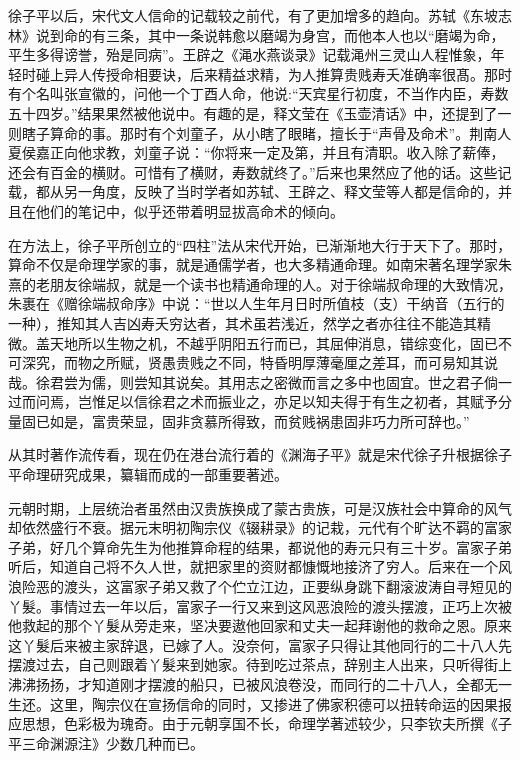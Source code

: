 \documentclass[a5paper,oneside,12pt]{ctexbook}
\begin{document}
徐子平以后，宋代文人信命的记载较之前代，有了更加增多的趋向。苏轼《东坡志林》说到命的有三条，其中一条说韩愈以磨竭为身宫，而他本人也以“磨竭为命，平生多得谤誉，殆是同病”。王辟之《渑水燕谈录》记载渑州三灵山人程惟象，年轻时碰上异人传授命相要诀，后来精益求精，为人推算贵贱寿夭准确率很髙。那时有个名叫张宣徽的，问他一个丁酉人命，他说:“天宾星行初度，不当作内臣，寿数五十四岁。”结果果然被他说中。有趣的是，释文莹在《玉壶清话》中，还提到了一则瞎子算命的事。那时有个刘童子，从小瞎了眼睹，擅长于“声骨及命术”。荆南人夏侯嘉正向他求教，刘童子说：“你将来一定及第，并且有清职。收入除了薪俸，还会有百金的横财。可惜有了横财，寿数就终了。”后来也果然应了他的话。这些记载，都从另一角度，反映了当时学者如苏轼、王辟之、释文莹等人都是信命的，并且在他们的笔记中，似乎还带着明显拔高命术的倾向。

在方法上，徐子平所创立的“四柱”法从宋代开始，已渐渐地大行于天下了。那时，算命不仅是命理学家的事，就是通儒学者，也大多精通命理。如南宋著名理学家朱熹的老朋友徐端叔，就是一个读书也精通命理的人。对于徐端叔命理的大致情况，朱裹在《赠徐端叔命序》中说：“世以人生年月日时所值枝（支）干纳音（五行的一种），推知其人吉凶寿夭穷达者，其术虽若浅近，然学之者亦往往不能造其精微。盖天地所以生物之机，不越乎阴阳五行而已，其屈伸消息，错综变化，固已不可深究，而物之所赋，贤愚贵贱之不同，特昏明厚薄毫厘之差耳，而可易知其说哉。徐君尝为儒，则尝知其说矣。其用志之密微而言之多中也固宜。世之君子倘一过而问焉，岂惟足以信徐君之术而振业之，亦足以知夫得于有生之初者，其赋予分量固已如是，富贵荣显，固非贪慕所得致，而贫贱祸患固非巧力所可辞也。”

从其时著作流传看，现在仍在港台流行着的《渊海子平》就是宋代徐子升根据徐子平命理研究成果，纂辑而成的一部重要著述。

元朝时期，上层统治者虽然由汉贵族换成了蒙古贵族，可是汉族社会中算命的风气却依然盛行不衰。据元末明初陶宗仪《辍耕录》的记栽，元代有个旷达不羁的富家子弟，好几个算命先生为他推算命程的结果，都说他的寿元只有三十岁。富家子弟听后，知道自己将不久人世，就把家里的资财都慷慨地接济了穷人。后来在一个风浪险恶的渡头，这富家子弟又救了个伫立江边，正要纵身跳下翻滚波涛自寻短见的丫髮。事情过去一年以后，富家子一行又来到这风恶浪险的渡头摆渡，正巧上次被他救起的那个丫髮从旁走来，坚决要遨他回家和丈夫一起拜谢他的救命之恩。原来这丫髮后来被主家辞退，已嫁了人。没奈何，富家子只得让其他同行的二十八人先摆渡过去，自己则跟着丫髮来到她家。待到吃过茶点，辞别主人出来，只听得街上沸沸扬扬，才知道刚才摆渡的船只，已被风浪卷没，而同行的二十八人，全都无一生还。这里，陶宗仪在宣扬信命的同时，又掺进了佛家积德可以扭转命运的因果报应思想，色彩极为瑰奇。由于元朝享国不长，命理学著述较少，只李钦夫所撰《子平三命渊源注》少数几种而已。
\end{document}
